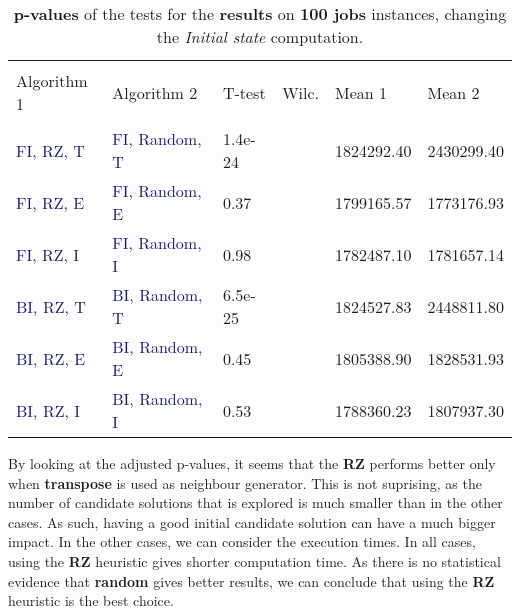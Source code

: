 \documentclass[
12pt,
a4paper,
oneside,
headinclude,
footinclude]{article}
\theoremstyle{definition} %
\begin{document}
\begin{table}[H]
    \begin{tabular}{l l l l l l} %
        \hline
        \hline 
        \\[-1.5ex]
        \textcolor{BrickRed}{Algorithm 1} & \textcolor{BrickRed}{Algorithm 2} & \textcolor{BrickRed}{T-test} & \textcolor{BrickRed}{Wilc.}  & \textcolor{BrickRed}{Mean 1} & \textcolor{BrickRed}{Mean 2}\\ [0.5ex]
        \hline %
        \\[-1.5ex]
        \textcolor{MidnightBlue}{FI, RZ, T} & \textcolor{MidnightBlue}{FI, Random, T} & 1.4e-24 &  & 1824292.40 & 2430299.40 \\ 
        \textcolor{MidnightBlue}{FI, RZ, E} & \textcolor{MidnightBlue}{FI, Random, E} & 0.37 &  & 1799165.57 & 1773176.93 \\ 
        \textcolor{MidnightBlue}{FI, RZ, I} & \textcolor{MidnightBlue}{FI, Random, I} & 0.98 &  & 1782487.10 & 1781657.14 \\ 
        \textcolor{MidnightBlue}{BI, RZ, T} & \textcolor{MidnightBlue}{BI, Random, T} & 6.5e-25 &  & 1824527.83 & 2448811.80 \\ 
        \textcolor{MidnightBlue}{BI, RZ, E} & \textcolor{MidnightBlue}{BI, Random, E} & 0.45 &  & 1805388.90 & 1828531.93 \\ 
        \textcolor{MidnightBlue}{BI, RZ, I} & \textcolor{MidnightBlue}{BI, Random, I} & 0.53 &  & 1788360.23 & 1807937.30 \\ 
        [1ex] %
        \hline %
    \end{tabular}
    \caption{\label{tab:ii-initialstate100res}\textbf{p-values} of the tests for the \textbf{results} on \textbf{100 jobs} instances, changing the \textit{Initial state} computation.}
\end{table} 

By looking at the adjusted p-values, it seems that the \textbf{RZ} performs better only when \textbf{transpose} is used as neighbour generator. This is not suprising, as the number of candidate solutions that is explored is much smaller than in the other cases. As such, having a good initial candidate solution can have a much bigger impact.
In the other cases, we can consider the execution times. In all cases, using the \textbf{RZ} heuristic gives shorter computation time. As there is no statistical evidence that \textbf{random} gives better results, we can conclude that using the \textbf{RZ} heuristic is the best choice.
\end{document}
